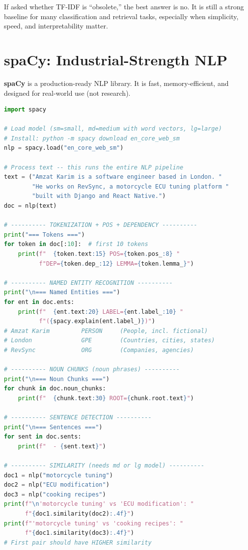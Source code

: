 \documentclass[12pt, a4paper, oneside]{book}
\begin{document}
\begin{examtipbox}
If asked whether TF-IDF is ``obsolete,'' the best answer is no. It is still a strong baseline for many classification and retrieval tasks, especially when simplicity, speed, and interpretability matter.
\end{examtipbox}

\section{spaCy: Industrial-Strength NLP}

\textbf{spaCy} is a production-ready NLP library. It is fast, memory-efficient, and designed for real-world use (not research).

\begin{lstlisting}[language=Python, caption={Comprehensive spaCy example}]
import spacy

# Load model (sm=small, md=medium with word vectors, lg=large)
# Install: python -m spacy download en_core_web_sm
nlp = spacy.load("en_core_web_sm")

# Process text -- this runs the entire NLP pipeline
text = ("Amzat Karim is a software engineer based in London. "
        "He works on RevSync, a motorcycle ECU tuning platform "
        "built with Django and React Native.")
doc = nlp(text)

# ---------- TOKENIZATION + POS + DEPENDENCY ----------
print("=== Tokens ===")
for token in doc[:10]:  # first 10 tokens
    print(f"  {token.text:15} POS={token.pos_:8} "
          f"DEP={token.dep_:12} LEMMA={token.lemma_}")

# ---------- NAMED ENTITY RECOGNITION ----------
print("\n=== Named Entities ===")
for ent in doc.ents:
    print(f"  {ent.text:20} LABEL={ent.label_:10} "
          f"({spacy.explain(ent.label_)})")
# Amzat Karim         PERSON     (People, incl. fictional)
# London              GPE        (Countries, cities, states)
# RevSync             ORG        (Companies, agencies)

# ---------- NOUN CHUNKS (noun phrases) ----------
print("\n=== Noun Chunks ===")
for chunk in doc.noun_chunks:
    print(f"  {chunk.text:30} ROOT={chunk.root.text}")

# ---------- SENTENCE DETECTION ----------
print("\n=== Sentences ===")
for sent in doc.sents:
    print(f"  - {sent.text}")

# ---------- SIMILARITY (needs md or lg model) ----------
doc1 = nlp("motorcycle tuning")
doc2 = nlp("ECU modification")
doc3 = nlp("cooking recipes")
print(f"\n'motorcycle tuning' vs 'ECU modification': "
      f"{doc1.similarity(doc2):.4f}")
print(f"'motorcycle tuning' vs 'cooking recipes': "
      f"{doc1.similarity(doc3):.4f}")
# First pair should have HIGHER similarity
\end{lstlisting}
\end{document}
